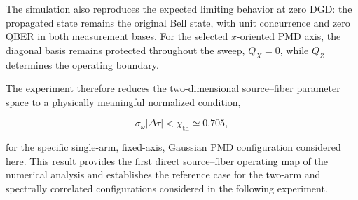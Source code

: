 The simulation also reproduces the expected limiting behavior at zero DGD:
the propagated state remains the original Bell state, with unit concurrence and
zero QBER in both measurement bases. For the selected \(x\)-oriented PMD axis,
the diagonal basis remains protected throughout the sweep,
\(Q_X=0\), while \(Q_Z\) determines the operating boundary.

The experiment therefore reduces the two-dimensional source--fiber parameter
space to a physically meaningful normalized condition,

\begin{equation}
\boxed{
\sigma_\omega|\Delta\tau|
<
\chi_{\mathrm{th}}
\simeq
0.705,
}
\label{eq:exp2_final_operational_condition}
\end{equation}

for the specific single-arm, fixed-axis, Gaussian PMD configuration considered
here. This result provides the first direct source--fiber operating map of the
numerical analysis and establishes the reference case for the two-arm and
spectrally correlated configurations considered in the following experiment.